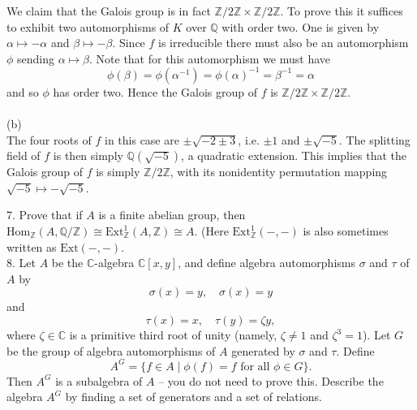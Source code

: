 \documentclass[11pt]{article}
\newcommand{\Z}{\mathbb{Z}}
\newcommand{\Q}{\mathbb{Q}}
\newcommand{\C}{\mathbb{C}}
\begin{document}
We claim that the Galois group is in fact $\Z/2\Z\times \Z/2\Z$. To prove this it suffices to exhibit two automorphisms of $K$ over $\Q$ with order two. One is given by $\alpha \mapsto -\alpha$ and $\beta\mapsto -\beta$. Since $f$ is irreducible there must also be an automorphism $\phi$ sending $\alpha \mapsto \beta$. Note that for this automorphism we must have \[
\phi(\beta) = \phi(\alpha^{-1}) = \phi(\alpha)^{-1} = \beta^{-1} = \alpha
\]
and so $\phi$ has order two. Hence the Galois group of $f$ is $\Z/2\Z\times\Z/2\Z$.\\\\
(b)\\
The four roots of $f$ in this case are $\pm \sqrt{-2\pm 3}$, i.e. $\pm 1$ and $\pm\sqrt{-5}$. The splitting field of $f$ is then simply $\Q(\sqrt{-5})$, a quadratic extension. This implies that the Galois group of $f$ is simply $\Z/2\Z$, with its nonidentity permutation mapping $\sqrt{-5}\mapsto -\sqrt{-5}$.  


\newpage

7. Prove that if $A$ is a finite abelian group, then $\mbox{Hom}_\Z(A,\Q/\Z)\cong \mbox{Ext}_\Z^1(A,\Z) \cong A$. (Here $\mbox{Ext}_\Z^1(-,-)$ is also sometimes written as $\mbox{Ext}(-,-)$. \\

8. Let $A$ be the $\C$-algebra $\C[x,y]$, and define algebra automorphisms $\sigma$ and $\tau$ of $A$ by \[
\sigma(x)= y, \quad \sigma(x) = y
\]
and \[
\tau(x) = x,\quad \tau(y) = \zeta y,
\]
where $\zeta\in \C$ is a primitive third root of unity (namely, $\zeta \neq 1$ and $\zeta^3 = 1$). Let $G$ be the group of algebra automorphisms of $A$ generated by $\sigma$ and $\tau$. Define \[
A^G = \{f\in A \mid \phi(f) = f\text{ for all } \phi\in G\}.
\]
Then $A^G$ is a subalgebra of $A$ -- you do not need to prove this. Describe the algebra $A^G$ by finding a set of generators and a set of relations. 
\end{document}

